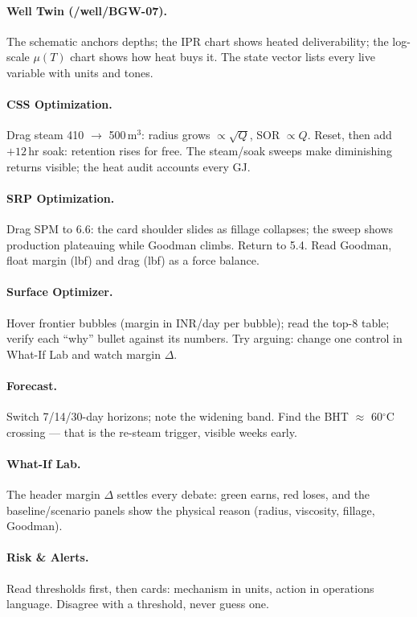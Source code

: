 \documentclass[12pt,a4paper]{report}
\begin{document}
\paragraph{Well Twin (/well/BGW-07).} The schematic anchors depths; the IPR
chart shows heated deliverability; the log-scale $\mu(T)$ chart shows how heat
buys it. The state vector lists every live variable with units and tones.

\paragraph{CSS Optimization.} Drag steam 410 $\rightarrow$ 500\,m$^3$: radius
grows $\propto\sqrt{Q}$, SOR $\propto Q$. Reset, then add $+12$\,hr soak:
retention rises for free. The steam/soak sweeps make diminishing returns
visible; the heat audit accounts every GJ.

\paragraph{SRP Optimization.} Drag SPM to 6.6: the card shoulder slides as
fillage collapses; the sweep shows production plateauing while Goodman climbs.
Return to 5.4. Read Goodman, float margin (lbf) and drag (lbf) as a force
balance.

\paragraph{Surface Optimizer.} Hover frontier bubbles (margin in INR/day per
bubble); read the top-8 table; verify each ``why'' bullet against its numbers.
Try arguing: change one control in What-If Lab and watch margin $\Delta$.

\paragraph{Forecast.} Switch 7/14/30-day horizons; note the widening band.
Find the BHT $\approx$ 60$^\circ$C crossing --- that is the re-steam trigger,
visible weeks early.

\paragraph{What-If Lab.} The header margin $\Delta$ settles every debate:
green earns, red loses, and the baseline/scenario panels show the physical
reason (radius, viscosity, fillage, Goodman).

\paragraph{Risk \& Alerts.} Read thresholds first, then cards: mechanism in
units, action in operations language. Disagree with a threshold, never guess
one.
\end{document}
